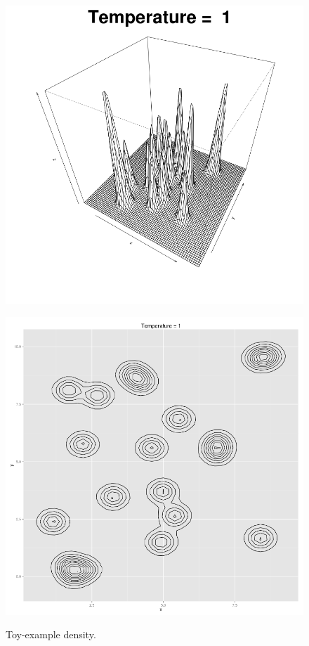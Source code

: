 \documentclass{book}
\begin{document}
\begin{figure}
	\begin{minipage}[b]{.5\linewidth}
		\centering \includegraphics[scale=.25]{./img/Liang_perspective.png}
		\label{LiangContour}
	\end{minipage}%
	\begin{minipage}[b]{.5\linewidth}
		\centering \includegraphics[scale=.25]{./img/Liang_Contour_plot.png}
	\label{LiangPerspective}
	\end{minipage}
	\caption{Toy-example density.}\label{ToyExample}
\end{figure}
\end{document}
